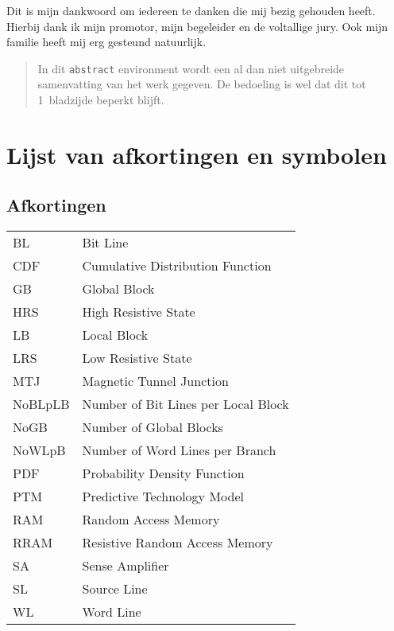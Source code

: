 \documentclass[master=elt,masteroption=eg]{kulemt}
\begin{document}
\begin{preface}
  Dit is mijn dankwoord om iedereen te danken die mij bezig gehouden heeft.
  Hierbij dank ik mijn promotor, mijn begeleider en de voltallige jury.
  Ook mijn familie heeft mij erg gesteund natuurlijk.
\end{preface}

\tableofcontents*

\begin{abstract}
  In dit \texttt{abstract} environment wordt een al dan niet uitgebreide
  samenvatting van het werk gegeven. De bedoeling is wel dat dit tot
  1~bladzijde beperkt blijft.

  \lipsum[1]
\end{abstract}

\listoffiguresandtables
\chapter{Lijst van afkortingen en symbolen}
\section*{Afkortingen}

\begin{flushleft}
  \renewcommand{\arraystretch}{1.1}
  \begin{tabularx}{\textwidth}{@{}p{18mm}X@{}}
    BL & Bit Line \\
    CDF & Cumulative Distribution Function \\
    GB & Global Block \\
    HRS & High Resistive State \\
    LB & Local Block \\
    LRS & Low Resistive State \\
    MTJ & Magnetic Tunnel Junction \\
    NoBLpLB & Number of Bit Lines per Local Block \\
    NoGB & Number of Global Blocks \\
    NoWLpB & Number of Word Lines per Branch \\
    PDF & Probability Density Function \\
    PTM & Predictive Technology Model \\
    RAM & Random Access Memory \\
    RRAM & Resistive Random Access Memory \\
    SA & Sense Amplifier \\
    SL & Source Line \\
    WL & Word Line \\
  \end{tabularx}
\end{flushleft}
\end{document}

